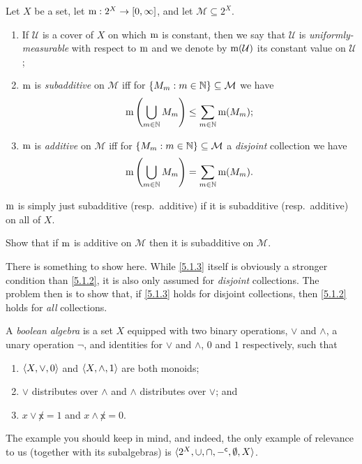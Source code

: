 \begin{dfn}
Let $X$ be a set, let $\mathrm{m} :2^X\rightarrow [0,\infty ]$, and let $\mathcal{M}\subseteq 2^X$.  
\begin{enumerate}
\item If $\mathcal{U}$ is a cover of $X$ on which $\mathrm{m}$ is constant, then we say that $\mathcal{U}$ is \emph{uniformly-measurable} with respect to $\mathrm{m}$ and we denote by $\mathrm{m} (\mathcal{U})$ its constant value on $\mathcal{U}$;
\item $\mathrm{m}$ is \emph{subadditive} on $\mathcal{M}$ iff for $\{ M_m:m\in \mathbb{N} \} \subseteq \mathcal{M}$ we have
\begin{equation}\label{5.1.2}
\mathrm{m} \left( \bigcup _{m\in \mathbb{N}}M_m\right) \leq \sum _{m\in \mathbb{N}}\mathrm{m} (M_m);
\end{equation}
\item $\mathrm{m}$ is \emph{additive} on $\mathcal{M}$ iff for $\{ M_m:m\in \mathbb{N} \} \subseteq \mathcal{M}$ a \emph{disjoint} collection we have
\begin{equation}\label{5.1.3}
\mathrm{m} \left( \bigcup _{m\in \mathbb{N}}M_m\right) =\sum _{m\in \mathbb{N}}\mathrm{m} (M_m).
\end{equation}
\end{enumerate}
$\mathrm{m}$ is simply just subadditive (resp.~additive) if it is subadditive (resp.~additive) on all of $X$.
\end{dfn}
\begin{exr}\label{exr5.1.4}
Show that if $\mathrm{m}$ is additive on $\mathcal{M}$ then it is subadditive on $\mathcal{M}$.
\begin{rmk}
There is something to show here.  While \eqref{5.1.3} itself is obviously a stronger condition than \eqref{5.1.2}, it is also only assumed for \emph{disjoint} collections.  The problem then is to show that, if \eqref{5.1.3} holds for disjoint collections, then \eqref{5.1.2} holds for \emph{all} collections.
\end{rmk}
\end{exr}
\begin{dfn}
A \emph{boolean algebra} is a set $X$ equipped with two binary operations, $\vee$ and $\wedge$, a unary operation $\neg$, and identities for $\vee$ and $\wedge$, $0$ and $1$ respectively, such that
\begin{enumerate}
\item $\langle X,\vee ,0\rangle$ and $\langle X,\wedge ,1\rangle$ are both monoids;
\item $\vee$ distributes over $\wedge$ and $\wedge$ distributes over $\vee$; and
\item $x\vee \not x=1$ and $x\wedge \not x=0$.
\end{enumerate}
\begin{rmk}
The example you should keep in mind, and indeed, the only example of relevance to us (together with its subalgebras) is $\langle2^X,\cup ,\cap ,{-} ^{\mathsf{c}},\emptyset ,X\rangle$.
\end{rmk}
\end{dfn}
